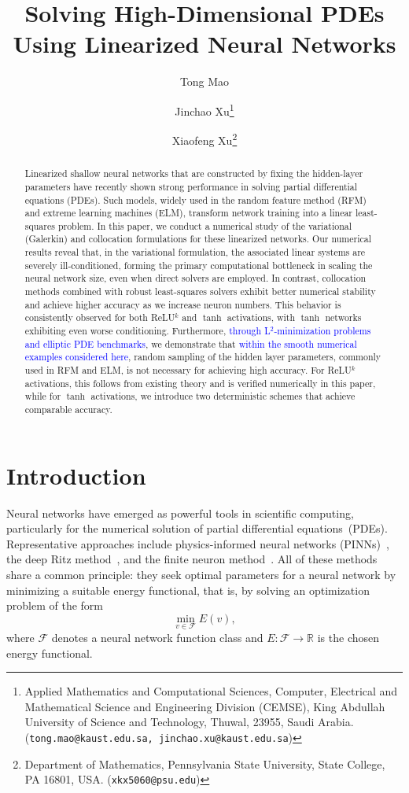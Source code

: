 \documentclass{article}
\title{Solving High-Dimensional PDEs \\Using Linearized Neural Networks}
\author{
Tong Mao\footnotemark[1]
\and
Jinchao Xu\thanks{
Applied Mathematics and Computational Sciences, Computer, Electrical and Mathematical Science and Engineering Division (CEMSE), King Abdullah University of Science and Technology, Thuwal, 23955, Saudi Arabia.
(\texttt{tong.mao@kaust.edu.sa, jinchao.xu@kaust.edu.sa})
}
\and 
Xiaofeng Xu\thanks{
Department of Mathematics, Pennsylvania State University, State College, PA 16801, USA.
(\texttt{xkx5060@psu.edu})
}
}
\date{}
\theoremstyle{remark}
\begin{document}
\maketitle


\begin{abstract}
Linearized shallow neural networks that are constructed by fixing the hidden-layer parameters have recently shown strong performance in solving partial differential equations (PDEs). 
Such models, widely used in the random feature method (RFM) and extreme learning machines (ELM), transform network training into a linear least-squares problem. 
In this paper, we conduct a numerical study of the variational (Galerkin) and collocation formulations for these linearized networks. 
Our numerical results reveal that, in the variational formulation, the associated linear systems are severely ill-conditioned, forming the primary computational bottleneck in scaling the neural network size, even when direct solvers are employed. 
In contrast, collocation methods combined with robust least-squares solvers exhibit better numerical stability and achieve higher accuracy as we increase neuron numbers.
This behavior is consistently observed for both ReLU$^k$ and $\tanh$ activations, with $\tanh$ networks exhibiting even worse conditioning. 
Furthermore, \textcolor{blue}{through L$^2$-minimization problems and elliptic PDE benchmarks}, we demonstrate that \textcolor{blue}{within the smooth numerical examples considered here}, random sampling of the hidden layer parameters, commonly used in RFM and ELM, is not necessary for achieving high accuracy.
For ReLU$^k$ activations, this follows from existing theory and is verified numerically in this paper, while for $\tanh$ activations, we introduce two deterministic schemes that achieve comparable accuracy.
\end{abstract}


\section{Introduction}
Neural networks have emerged as powerful tools in scientific computing, 
particularly for the numerical solution of partial differential equations~(PDEs). 
Representative approaches include physics-informed neural networks (PINNs)~\cite{Cuomo:2022,RPK:2019}, 
the deep Ritz method~\cite{EY:2018}, and the finite neuron method~\cite{Xu:2020}. 
All of these methods share a common principle: they seek optimal parameters for a neural 
network by minimizing a suitable energy functional, that is, by solving an optimization 
problem of the form
\begin{equation}
\label{NN_optimization}
\min_{v \in \mathcal{F}} E(v),
\end{equation}
where $\mathcal{F}$ denotes a neural network function class and $E \colon \mathcal{F} \to \mathbb{R}$ 
is the chosen energy functional.
\end{document}

